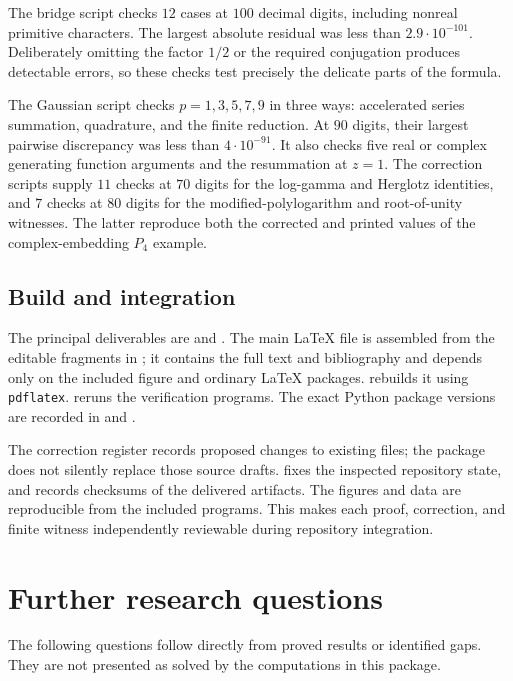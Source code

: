 \documentclass[11pt,a4paper]{article}
\theoremstyle{definition}
\theoremstyle{remark}
\numberwithin{equation}{section}
\begin{document}
The bridge script checks $12$ cases at $100$ decimal digits, including
nonreal primitive characters. The largest absolute residual was
less than $2.9\cdot10^{-101}$. Deliberately omitting the factor
$1/2$ or the required conjugation produces detectable errors, so
these checks test precisely the delicate parts of the formula.

The Gaussian script checks $p=1,3,5,7,9$ in three ways: accelerated
series summation, quadrature, and the finite reduction.
At $90$ digits, their largest pairwise discrepancy was less than
$4\cdot10^{-91}$. It also checks five real or complex generating
function arguments and the resummation at $z=1$.
The correction scripts supply $11$ checks at $70$ digits for the
log-gamma and Herglotz identities, and $7$ checks at $80$ digits
for the modified-polylogarithm and root-of-unity witnesses.
The latter reproduce both the corrected and printed values of the
complex-embedding $P_4$ example.

\subsection{Build and integration}

The principal deliverables are
 and
. The main \LaTeX{} file is
assembled from the editable fragments in ; it
contains the full text and bibliography and depends only on the
included figure and ordinary \LaTeX{} packages.
 rebuilds it using \texttt{pdflatex}.
 reruns the verification programs.
The exact Python package versions are recorded in
 and .

The correction register records proposed changes to existing files;
the package does not silently replace those source drafts.
 fixes the inspected repository state, and
 records checksums of the delivered artifacts.
The figures and data are reproducible from the included programs.
This makes each proof, correction, and finite witness independently
reviewable during repository integration.

\section{Further research questions}
\label{questions:section}

The following questions follow directly from proved results or identified
gaps.  They are not presented as solved by the computations in this package.
\end{document}
